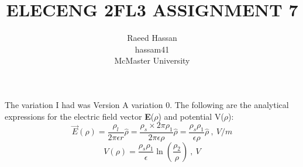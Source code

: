 \documentclass[12pt]{article}
\title{ELECENG 2FL3 ASSIGNMENT 7}
\author{Raeed Hassan \\ hassam41 \\ McMaster University}
\begin{document}
\maketitle
\pagebreak
The variation I had was Version A variation 0. The following are the analytical expressions for the electric field vector \textbf{E}($\rho$) and potential V($\rho$):
\[
\vec{E}(\rho) = \frac{\rho_l}{2\pi\epsilon r}\hat{\rho} = \frac{\rho_s\times2\pi\rho_1}{2\pi\epsilon \rho}\hat{\rho} = \frac{\rho_s\rho_1}{\epsilon \rho}\hat{\rho} ~,~ V/m
\]
\[
V(\rho) = \frac{\rho_s\rho_1}{\epsilon}\ln{\left(\frac{\rho_2}{\rho}\right)} ~,~ V 
\]
\end{document}
